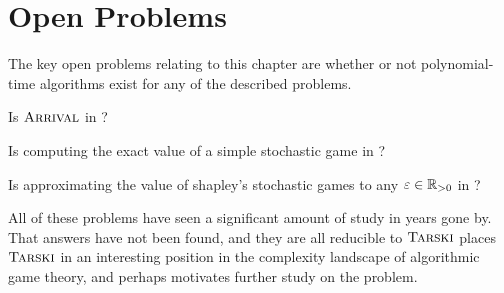 \section{Open Problems}
The key open problems relating to this chapter are whether or not polynomial-time
algorithms exist for any of the described problems.
\begin{open}
  Is $\textsc{Arrival}$ in \PClass?
\end{open}
\begin{open}
  Is computing the exact value of a simple stochastic game in \PClass?
\end{open}
\begin{open}
  Is approximating the value of shapley's stochastic games to any $\varepsilon \in \mathbb{R}_{> 0}$
  in \PClass?
\end{open}
All of these problems have seen a significant amount of study in years gone by.
That answers have not been found, and they are all reducible to $\textsc{Tarski}$ places
$\textsc{Tarski}$ in an interesting position in the complexity landscape of algorithmic game theory,
and perhaps motivates further study on the problem.

